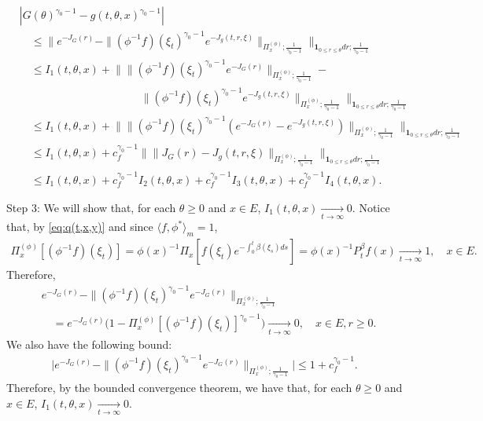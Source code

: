 \documentclass[12pt,a4paper]{amsart}
\theoremstyle{definition}
\numberwithin{equation}{section}
\begin{document}
\begin{align}
	&|  G(\theta)^{\gamma_0 - 1} - g(t,\theta,x)^{\gamma_0 - 1} |
	\\ & \quad \leq \Big\| e^{ - J_G(r)} - \| (\phi^{-1}f)(\xi_t)^{\gamma_0 - 1} e^{-J_g(t, r,\xi)} \|_{\Pi_x^{(\phi)};\frac{1}{\gamma_0 - 1}} \Big\|_{\mathbf 1_{0\leq r\leq \theta} dr;\frac{1}{\gamma_0 - 1}}
	\\ & \quad \leq I_1(t,\theta,x) + \Big\| \| (\phi^{-1}f)(\xi_t)^{\gamma_0 - 1} e^{-J_G(r)} \|_{\Pi_x^{(\phi)};\frac{1}{\gamma_0 - 1}} -
	\\ & \quad \qquad \qquad \qquad \qquad \qquad \| (\phi^{-1}f)(\xi_t)^{\gamma_0 - 1} e^{-J_g(t,r,\xi)} \|_{\Pi_x^{(\phi)};\frac{1}{\gamma_0 - 1}} \Big\|_{\mathbf 1_{0\leq r\leq \theta} dr;\frac{1}{\gamma_0 - 1}}
	\\ & \quad \leq I_1(t,\theta,x) + \Big\| \|  (\phi^{-1}f)(\xi_t)^{\gamma_0 - 1} ( e^{-J_G(r)} - e^{-J_g(t,r,\xi)} )  \|_{\Pi_x^{(\phi)};\frac{1}{\gamma_0 - 1}} \Big\|_{\mathbf 1_{0\leq r\leq \theta} dr;\frac{1}{\gamma_0 - 1}}
	\\ & \quad \leq I_1(t,\theta,x) + c_f^{\gamma_0 - 1}\Big\| \|  J_G(r) -J_g(t,r,\xi)  \|_{\Pi_x^{(\phi)};\frac{1}{\gamma_0 - 1}} \Big\|_{\mathbf 1_{0\leq r\leq \theta} dr;\frac{1}{\gamma_0 - 1}}
	\\ & \quad \leq I_1(t,\theta,x) + c_f^{\gamma_0 - 1} I_2(t,\theta,x) +c_f^{\gamma_0 - 1} I_3(t,\theta,x)+c_f^{\gamma_0 - 1} I_4(t,\theta,x).
\end{align}	

Step 3: We will show that, for each $\theta \geq 0$ and $x\in E$, $I_1(t,\theta,x) \xrightarrow[t\to \infty]{} 0$.
Notice that, by \eqref{eq:q(t,x,y)} and since $\langle f,\phi^* \rangle_m = 1$,
\begin{align}
	\Pi_x^{(\phi)} [(\phi^{-1}f)(\xi_t)]
	= \phi(x)^{-1}\Pi_x[f(\xi_t) e^{- \int_0^t \beta(\xi_s) ds}]
	= \phi(x)^{-1} P^\beta_t f(x)
	\xrightarrow[t\to \infty]{} 1,
	\quad x\in E.
\end{align}
Therefore,
\begin{align}
	&e^{ - J_G(r)} - \| (\phi^{-1}f)(\xi_t)^{\gamma_0 - 1} e^{-J_G(r)} \|_{\Pi_x^{(\phi)};\frac{1}{\gamma_0 - 1}}
	\\&\quad =e^{ - J_G(r)} \Big( 1   -  \Pi_x^{(\phi)}[ (\phi^{-1}f)(\xi_t) ]^{\gamma_0 - 1}   \Big)
	\xrightarrow[t\to \infty]{} 0,
	\quad x\in E, r\geq 0.
\end{align}
We also have the following bound:
\begin{align}
	\Big| e^{ - J_G(r)} - \| (\phi^{-1}f)(\xi_t)^{\gamma_0 - 1} e^{-J_G(r)} \|_{\Pi_x^{(\phi)};\frac{1}{\gamma_0 - 1}} \Big|
	\leq 1+ c_f^{\gamma_0 - 1}.
\end{align}
Therefore, by the bounded convergence theorem, we have that, for each $\theta \geq 0$ and $x\in E$, $I_1(t,\theta, x) \xrightarrow[t\to \infty]{} 0$.
	
\end{document}
